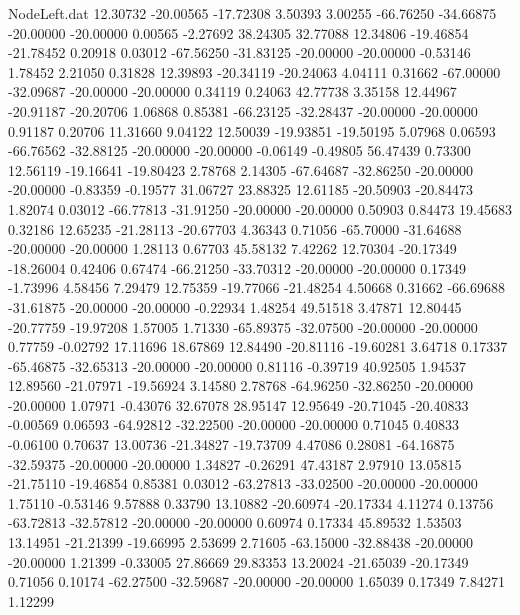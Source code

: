 \begin{filecontents}{NodeLeft.dat}
  12.30732  -20.00565  -17.72308     3.50393    3.00255  -66.76250  -34.66875  -20.00000  -20.00000    0.00565   -2.27692   38.24305   32.77088
  12.34806  -19.46854  -21.78452     0.20918    0.03012  -67.56250  -31.83125  -20.00000  -20.00000   -0.53146    1.78452    2.21050    0.31828
  12.39893  -20.34119  -20.24063     4.04111    0.31662  -67.00000  -32.09687  -20.00000  -20.00000    0.34119    0.24063   42.77738    3.35158
  12.44967  -20.91187  -20.20706     1.06868    0.85381  -66.23125  -32.28437  -20.00000  -20.00000    0.91187    0.20706   11.31660    9.04122
  12.50039  -19.93851  -19.50195     5.07968    0.06593  -66.76562  -32.88125  -20.00000  -20.00000   -0.06149   -0.49805   56.47439    0.73300
  12.56119  -19.16641  -19.80423     2.78768    2.14305  -67.64687  -32.86250  -20.00000  -20.00000   -0.83359   -0.19577   31.06727   23.88325
  12.61185  -20.50903  -20.84473     1.82074    0.03012  -66.77813  -31.91250  -20.00000  -20.00000    0.50903    0.84473   19.45683    0.32186
  12.65235  -21.28113  -20.67703     4.36343    0.71056  -65.70000  -31.64688  -20.00000  -20.00000    1.28113    0.67703   45.58132    7.42262
  12.70304  -20.17349  -18.26004     0.42406    0.67474  -66.21250  -33.70312  -20.00000  -20.00000    0.17349   -1.73996    4.58456    7.29479
  12.75359  -19.77066  -21.48254     4.50668    0.31662  -66.69688  -31.61875  -20.00000  -20.00000   -0.22934    1.48254   49.51518    3.47871
  12.80445  -20.77759  -19.97208     1.57005    1.71330  -65.89375  -32.07500  -20.00000  -20.00000    0.77759   -0.02792   17.11696   18.67869
  12.84490  -20.81116  -19.60281     3.64718    0.17337  -65.46875  -32.65313  -20.00000  -20.00000    0.81116   -0.39719   40.92505    1.94537
  12.89560  -21.07971  -19.56924     3.14580    2.78768  -64.96250  -32.86250  -20.00000  -20.00000    1.07971   -0.43076   32.67078   28.95147
  12.95649  -20.71045  -20.40833    -0.00569    0.06593  -64.92812  -32.22500  -20.00000  -20.00000    0.71045    0.40833   -0.06100    0.70637
  13.00736  -21.34827  -19.73709     4.47086    0.28081  -64.16875  -32.59375  -20.00000  -20.00000    1.34827   -0.26291   47.43187    2.97910
  13.05815  -21.75110  -19.46854     0.85381    0.03012  -63.27813  -33.02500  -20.00000  -20.00000    1.75110   -0.53146    9.57888    0.33790
  13.10882  -20.60974  -20.17334     4.11274    0.13756  -63.72813  -32.57812  -20.00000  -20.00000    0.60974    0.17334   45.89532    1.53503
  13.14951  -21.21399  -19.66995     2.53699    2.71605  -63.15000  -32.88438  -20.00000  -20.00000    1.21399   -0.33005   27.86669   29.83353
  13.20024  -21.65039  -20.17349     0.71056    0.10174  -62.27500  -32.59687  -20.00000  -20.00000    1.65039    0.17349    7.84271    1.12299

\end{filecontents}
